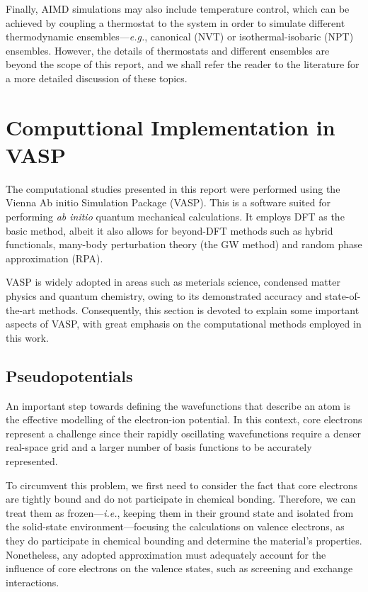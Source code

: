 Finally, AIMD simulations may also include temperature control, 
which can be achieved by coupling a thermostat to the system in order 
to simulate different thermodynamic ensembles---\emph{e.g.}, canonical (NVT) or isothermal-isobaric (NPT) ensembles.
However, the details of thermostats and different ensembles are beyond the scope
of this report, and we shall refer the reader to the literature\supercite{tuckerman2023statistical,frenkel2023understanding} for a more 
detailed discussion of these topics.

\section{Computtional Implementation in VASP}
The computational studies presented in this report were performed using the 
Vienna Ab initio Simulation Package (VASP). This is a software suited for performing 
\emph{ab initio} quantum mechanical calculations\supercite{https://doi.org/10.1002/jcc.21057}. It employs DFT as the basic 
method, albeit it also allows for beyond-DFT methods such as hybrid functionals, 
many-body perturbation theory (the GW method) and random phase approximation (RPA). 

VASP is widely adopted in areas such as meterials science, condensed matter physics and quantum chemistry, 
owing to its demonstrated accuracy and state-of-the-art methods. Consequently, 
this section is devoted to explain some important aspects of VASP, with great 
emphasis on the computational methods employed in this work. 

\subsection{Pseudopotentials}
An important step towards defining the wavefunctions that describe an atom 
is the effective modelling of the electron-ion potential. In this context, core electrons
represent a challenge since their rapidly oscillating wavefunctions require 
a denser real-space grid and a larger number of basis functions 
to be accurately represented.

To circumvent this problem, we first need to consider the fact that core electrons 
are tightly bound and do not participate in chemical bonding. Therefore, we can 
treat them as frozen---\emph{i.e.}, keeping them in their ground state and isolated 
from the solid-state environment---focusing the calculations on valence electrons, 
as they do participate in chemical bounding and determine the material's properties.
Nonetheless, any adopted approximation must adequately account for the influence of core electrons 
on the valence states, such as screening and exchange interactions.

